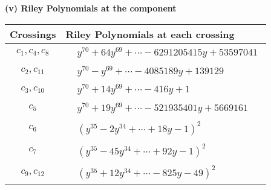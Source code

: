 \documentclass[1p]{elsarticle_modified}
\theoremstyle{definition}
\begin{document}
\flushleft \textbf{(v) Riley Polynomials at the component}\newline \\
\begin{tabular}{m{50pt}|m{274pt}}
Crossings & \hspace{64pt}Riley Polynomials at each crossing \\
\hline $$\begin{aligned}c_{1},c_{4},c_{8}\end{aligned}$$&$\begin{aligned}
&y^{70}+64 y^{69}+\cdots-6291205415 y+53597041
\end{aligned}$\\
\hline $$\begin{aligned}c_{2},c_{11}\end{aligned}$$&$\begin{aligned}
&y^{70}- y^{69}+\cdots-4085189 y+139129
\end{aligned}$\\
\hline $$\begin{aligned}c_{3},c_{10}\end{aligned}$$&$\begin{aligned}
&y^{70}+14 y^{69}+\cdots-416 y+1
\end{aligned}$\\
\hline $$\begin{aligned}c_{5}\end{aligned}$$&$\begin{aligned}
&y^{70}+19 y^{69}+\cdots-521935401 y+5669161
\end{aligned}$\\
\hline $$\begin{aligned}c_{6}\end{aligned}$$&$\begin{aligned}
&(y^{35}-2 y^{34}+\cdots+18 y-1)^{2}
\end{aligned}$\\
\hline $$\begin{aligned}c_{7}\end{aligned}$$&$\begin{aligned}
&(y^{35}-45 y^{34}+\cdots+92 y-1)^{2}
\end{aligned}$\\
\hline $$\begin{aligned}c_{9},c_{12}\end{aligned}$$&$\begin{aligned}
&(y^{35}+12 y^{34}+\cdots-825 y-49)^{2}
\end{aligned}$\\
\hline
\end{tabular}\\~\\
\end{document}
